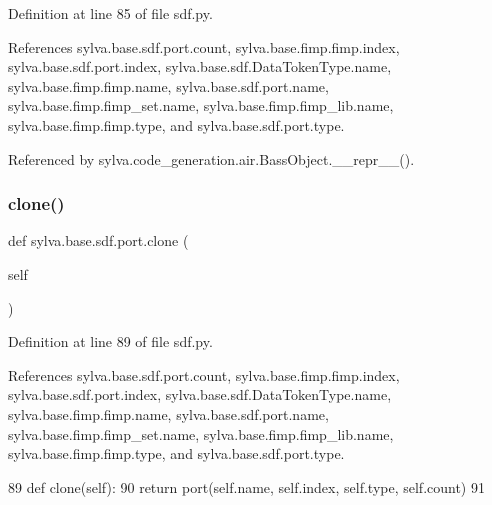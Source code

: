 Definition at line 85 of file sdf.\+py.



References sylva.\+base.\+sdf.\+port.\+count, sylva.\+base.\+fimp.\+fimp.\+index, sylva.\+base.\+sdf.\+port.\+index, sylva.\+base.\+sdf.\+Data\+Token\+Type.\+name, sylva.\+base.\+fimp.\+fimp.\+name, sylva.\+base.\+sdf.\+port.\+name, sylva.\+base.\+fimp.\+fimp\+\_\+set.\+name, sylva.\+base.\+fimp.\+fimp\+\_\+lib.\+name, sylva.\+base.\+fimp.\+fimp.\+type, and sylva.\+base.\+sdf.\+port.\+type.



Referenced by sylva.\+code\+\_\+generation.\+air.\+Bass\+Object.\+\_\+\+\_\+repr\+\_\+\+\_\+().


\mbox{\label{classsylva_1_1base_1_1sdf_1_1port_ae5c6adc9c86e717d12901d73699bb432}} 
\subsubsection{\texorpdfstring{clone()}{clone()}}
{\footnotesize\ttfamily def sylva.\+base.\+sdf.\+port.\+clone (\begin{DoxyParamCaption}\item[{}]{self }\end{DoxyParamCaption})}



Definition at line 89 of file sdf.\+py.



References sylva.\+base.\+sdf.\+port.\+count, sylva.\+base.\+fimp.\+fimp.\+index, sylva.\+base.\+sdf.\+port.\+index, sylva.\+base.\+sdf.\+Data\+Token\+Type.\+name, sylva.\+base.\+fimp.\+fimp.\+name, sylva.\+base.\+sdf.\+port.\+name, sylva.\+base.\+fimp.\+fimp\+\_\+set.\+name, sylva.\+base.\+fimp.\+fimp\+\_\+lib.\+name, sylva.\+base.\+fimp.\+fimp.\+type, and sylva.\+base.\+sdf.\+port.\+type.


\begin{DoxyCode}
89         \textcolor{keyword}{def }clone(self):
90             \textcolor{keywordflow}{return} port(self.name, self.index, self.type, self.count)
91 
\end{DoxyCode}
\mbox{\label{classsylva_1_1base_1_1sdf_1_1port_a19793d8e6190538a7d5cd014b08441b4}} 
